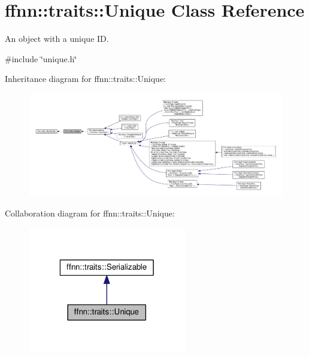\hypertarget{classffnn_1_1traits_1_1_unique}{\section{ffnn\-:\-:traits\-:\-:Unique Class Reference}
\label{classffnn_1_1traits_1_1_unique}
}


An object with a unique I\-D.  




{\ttfamily \#include \char`\"{}unique.\-h\char`\"{}}



Inheritance diagram for ffnn\-:\-:traits\-:\-:Unique\-:
\nopagebreak
\begin{figure}[H]
\begin{center}
\leavevmode
\includegraphics[width=350pt]{classffnn_1_1traits_1_1_unique__inherit__graph}
\end{center}
\end{figure}


Collaboration diagram for ffnn\-:\-:traits\-:\-:Unique\-:\nopagebreak
\begin{figure}[H]
\begin{center}
\leavevmode
\includegraphics[width=196pt]{classffnn_1_1traits_1_1_unique__coll__graph}
\end{center}
\end{figure}
